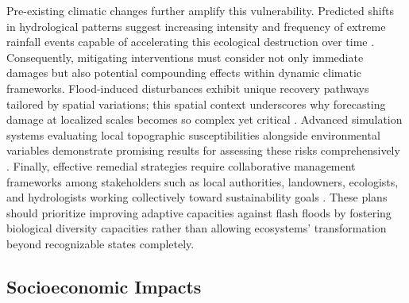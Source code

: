 Pre-existing climatic changes further amplify this vulnerability. Predicted shifts in hydrological patterns suggest increasing intensity and frequency of extreme rainfall events capable of accelerating this ecological destruction over time \citep{Msigwa2024}\citep{Nguyen2020}. Consequently, mitigating interventions must consider not only immediate damages but also potential compounding effects within dynamic climatic frameworks.
Flood-induced disturbances exhibit unique recovery pathways tailored by spatial variations; this spatial context underscores why forecasting damage at localized scales becomes so complex yet critical \citep{Ritter2021a}\citep{Ritter2021b}. Advanced simulation systems evaluating local topographic susceptibilities alongside environmental variables demonstrate promising results for assessing these risks comprehensively \citep{Ritter2021a}\citep{Ritter2021b}.
Finally, effective remedial strategies require collaborative management frameworks among stakeholders such as local authorities, landowners, ecologists, and hydrologists working collectively toward sustainability goals \citep{Beilicci2024}. These plans should prioritize improving adaptive capacities against flash floods by fostering biological diversity capacities rather than allowing ecosystems' transformation beyond recognizable states completely.

\subsection{Socioeconomic Impacts}

